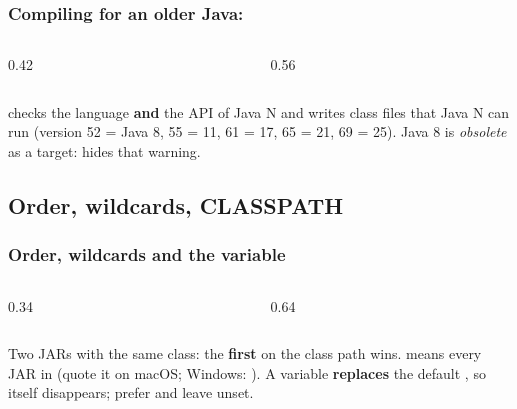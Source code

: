 \documentclass[aspectratio=169,10pt,compress]{beamer}
\begin{document}
\begin{frame}[t,fragile] \frametitle{Compiling for an older Java: }
  \begin{columns}[T]
    \begin{column}{0.42\textwidth}
    \end{column}
    \begin{column}{0.56\textwidth}
    \end{column}
  \end{columns}

  \vspace{0.1em}
  \small {} checks the language \textbf{and} the API of Java N and writes class files that Java N can run
  (version 52 = Java 8, 55 = 11, 61 = 17, 65 = 21, 69 = 25).
  Java 8 is \emph{obsolete} as a target:  hides that warning.
\end{frame}


\subsection[Order]{Order, wildcards, CLASSPATH}




\begin{frame}[t,fragile] \frametitle{Order, wildcards and the  variable}
  \begin{columns}[T]
    \begin{column}{0.34\textwidth}
    \end{column}
    \begin{column}{0.64\textwidth}
    \end{column}
  \end{columns}

  \vspace{0.1em}
  \small Two JARs with the same class: the \textbf{first} on the class path wins.  means every JAR in 
  (quote it on macOS; Windows: ). A  variable \textbf{replaces} the default ,
  so  itself disappears; prefer  and leave  unset.
\end{frame}
\end{document}
